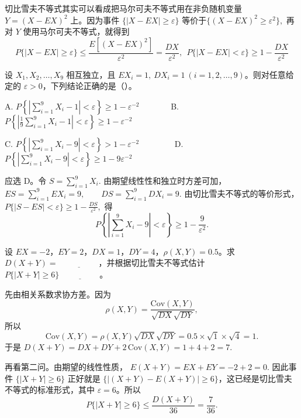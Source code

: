 \documentclass[lang=cn,11pt]{elegantbook}
\begin{document}
\begin{theorem}[切比雪夫不等式] \label{thm:chebyshev}
切比雪夫不等式其实可以看成把马尔可夫不等式用在非负随机变量 \(Y=(X-EX)^2\) 上。因为事件 \(\{|X-EX|\ge \varepsilon\}\) 等价于\(\{(X-EX)^2\ge \varepsilon^2\},\)
再对 \(Y\) 使用马尔可夫不等式，就得到
\[
P\{|X-EX|\geqslant \varepsilon\}\leqslant \frac{E[(X-EX)^2]}{\varepsilon^2}=\frac{DX}{\varepsilon^2},~~P\{|X - EX| < \varepsilon\} \geqslant 1 - \frac{DX}{\varepsilon^2}
\]
\end{theorem}


\begin{exercise}\label{exer:src-2015-spring-a-ii-06}\label{exer:src-2004-2a-06-chebyshev}\label{exer:src-2004-3a-06-chebyshev}
设 \(X_1,X_2,\dots,X_9\) 相互独立，且 \(EX_i=1,\ DX_i=1\ (i=1,2,\dots,9)\)。则对任意给定的 \(\varepsilon>0\)，下列结论正确的是（\quad）。\par
A. \(\displaystyle P\left\{\left|\sum_{i=1}^9X_i-1\right|<\varepsilon\right\}\ge1-\varepsilon^{-2}\)~~~~~~~
B. \(\displaystyle P\left\{\left|\frac19\sum_{i=1}^9X_i-1\right|<\varepsilon\right\}\ge1-\varepsilon^{-2}\)\par
C. \(\displaystyle P\left\{\left|\sum_{i=1}^9X_i-9\right|<\varepsilon\right\}>1-\varepsilon^{-2}\)~~~~~~~~
D. \(\displaystyle P\left\{\left|\sum_{i=1}^9X_i-9\right|<\varepsilon\right\}\ge1-9\varepsilon^{-2}\)
\end{exercise}
\begin{solution}
应选 D。令
\(
S=\sum_{i=1}^9X_i.
\)
由期望线性性和独立时方差可加，
\(
ES=\sum_{i=1}^9EX_i=9,\qquad
DS=\sum_{i=1}^9DX_i=9.
\)
由切比雪夫不等式的等价形式，
\(
P\{|S-ES|<\varepsilon\}\ge1-\frac{DS}{\varepsilon^2},
\)
得
\[
P\left\{\left|\sum_{i=1}^9X_i-9\right|<\varepsilon\right\}
\ge1-\frac9{\varepsilon^2}.
\]
\end{solution}







\begin{exercise}\label{exer:5-chebyshev-sum}
设 \(EX = -2\)，\(EY = 2\)，\(DX = 1\)，\(DY = 4\)，\(\rho(X,Y) = 0.5\)。求 \(D(X+Y) =\,\underline{\hspace{2cm}}\)，并根据切比雪夫不等式估计 \(P\{|X+Y| \geq 6\}\,\underline{\hspace{2cm}}\)。
\end{exercise}
\begin{solution}
先由相关系数求协方差。因为
\[
\rho(X,Y)=\frac{\mathrm{Cov}(X,Y)}{\sqrt{DX}\sqrt{DY}},
\]
所以
\[
\mathrm{Cov}(X,Y)=\rho(X,Y)\sqrt{DX}\sqrt{DY}
=0.5\times \sqrt{1}\times \sqrt{4}=1.
\]
于是
\(
D(X+Y) = DX + DY + 2\,\mathrm{Cov}(X,Y) = 1 + 4 + 2 = 7.
\)

再看第二问。由期望的线性性质，
\(
E(X+Y)=EX+EY=-2+2=0.
\)
因此事件 \(\{|X+Y|\ge 6\}\) 正好就是 \(\{|(X+Y)-E(X+Y)|\ge 6\}\)，这已经是切比雪夫不等式的标准形式，其中 \(\varepsilon=6\)。所以
\[
P\{|X+Y| \geq 6\} \leq \frac{D(X+Y)}{36} = \frac{7}{36}.
\]
\end{solution}
\end{document}
